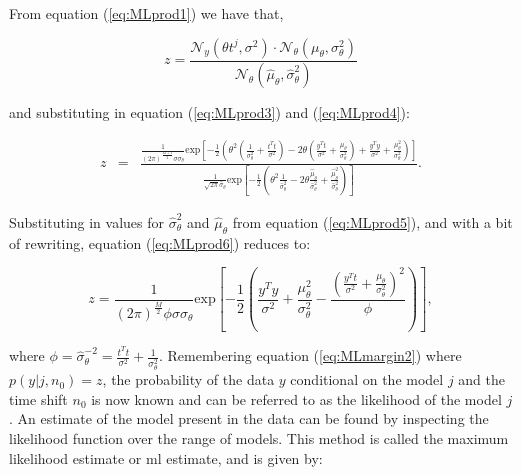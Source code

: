 From equation (\ref{eq:MLprod1}) we have that,

\begin{equation}\label{eq:MLprod2}
z = \frac{\mathcal{N}_y(\theta t^j,\sigma^2)\cdot\mathcal{N}_\theta(\mu_\theta,\sigma^2_\theta)}{\mathcal{N}_\theta(\hat{\mu}_\theta,\hat{\sigma}^2_\theta)}
\end{equation}

and substituting in equation (\ref{eq:MLprod3}) and (\ref{eq:MLprod4}):

\begin{eqnarray}\label{eq:MLprod6}
z &=& \frac{\frac{1}{\left(2\pi\right)^{\frac{M+1}{2}} \sigma \sigma_\theta} \textrm{exp}\left[-\frac{1}{2}\left(\theta^2 \left(\frac{1}{\sigma_\theta^2}+\frac{t^T t}{\sigma^2}\right) - 2\theta\left(\frac{y^T t}{\sigma^2}+\frac{\mu_\theta}{\sigma_\theta^2}\right) + \frac{y^T y}{\sigma^2} +\frac{\mu_\theta^2}{\sigma_\theta^2}\right)\right]}{\frac{1}{\sqrt{2 \pi}\hat{\sigma}_\theta}\textrm{exp}\left[-\frac{1}{2}\left(\theta^2\frac{1}{\hat{\sigma}^2_\theta} - 2\theta\frac{\hat{\mu}_\theta}{\hat{\sigma}^2_\theta} + \frac{\hat{\mu}_\theta^2}{\hat{\sigma}^2_\theta}  \right)\right]}.
\end{eqnarray}

Substituting in values for $\hat{\sigma}^2_\theta$ and $\hat{\mu}_\theta$ from equation (\ref{eq:MLprod5}), and with a bit of rewriting, equation (\ref{eq:MLprod6}) reduces to:

\begin{equation}\label{eq:MLprod7}
z = \frac{1}{\left(2 \pi\right)^{\frac{M}{2}}\phi \sigma \sigma_\theta}\textrm{exp}\left[-\frac{1}{2}\left(\frac{y^T y}{\sigma^2}+\frac{\mu_\theta^2}{\sigma_\theta^2} - \frac{\left(\frac{y^T t}{\sigma^2}+\frac{\mu_\theta}{\sigma_\theta^2}\right)^2}{\phi}\right)\right],
\end{equation}

where $\phi = \hat{\sigma}^{-2}_\theta = \frac{t^Tt}{\sigma^2} + \frac{1}{\sigma_\theta^2}$. Remembering equation (\ref{eq:MLmargin2}) \linebreak[0]where \linebreak[0]$p(y|j,n_0) = z$, the probability of the data $y$ conditional on the model $j$ and the time shift $n_0$ is now known and can be referred to as the likelihood of the model $j$. An estimate of the model present in the data can be found by inspecting the likelihood function over the range of models. This method is called the maximum likelihood estimate or \gls{ml} estimate, and is given by:

